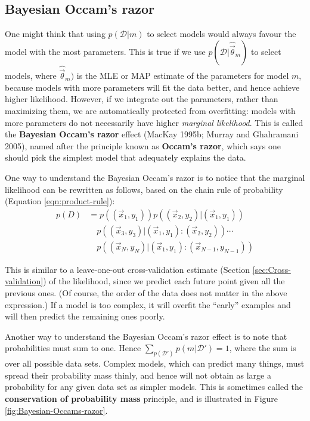 \subsection{Bayesian Occam's razor}
One might think that using $p(\mathcal{D}|m)$ to select models would always favour the model with the most parameters. This is true if we use $p(\mathcal{D}|\hat{\vec{\theta}}_m)$ to select models, where $\hat{\vec{\theta}}_m)$ is the MLE or MAP estimate of the parameters for model $m$, because models with more parameters will fit the data better, and hence achieve higher likelihood. However, if we integrate out the parameters, rather than maximizing them, we are automatically protected from overfitting: models with more parameters do not necessarily have higher \emph{marginal likelihood}. This is called the \textbf{Bayesian Occam’s razor} effect (MacKay 1995b; Murray and Ghahramani 2005), named after the principle known as \textbf{Occam’s razor}, which says one should pick the simplest model that adequately explains the data.

One way to understand the Bayesian Occam’s razor is to notice that the marginal likelihood can be rewritten as follows, based on the chain rule of probability (Equation \ref{eqn:product-rule}):
\begin{equation}\begin{split}
p(D) & =p((\vec{x}_1,y_1))p((\vec{x}_2,y_2)|(\vec{x}_1,y_1)) \\
     & \quad p((\vec{x}_3,y_3)|(\vec{x}_1,y_1):(\vec{x}_2,y_2))\cdots \\
	 & \quad p((\vec{x}_N,y_N)|(\vec{x}_1,y_1):(\vec{x}_{N-1},y_{N-1}))
\end{split}\end{equation}

This is similar to a leave-one-out cross-validation estimate (Section \ref{sec:Cross-validation}) of the likelihood, since we predict each future point given all the previous ones. (Of course, the order of the data does not matter in the above expression.) If a model is too complex, it will overfit the “early” examples and will then predict the remaining ones poorly.

Another way to understand the Bayesian Occam’s razor effect is to note that probabilities must sum to one. Hence $\sum_{p(\mathcal{D}')} p(m|\mathcal{D}')=1$, where the sum is over all possible data sets. Complex models, which can predict many things, must spread their probability mass thinly, and hence will not obtain as large a probability for any given data set as simpler models. This is sometimes called the \textbf{conservation of probability mass} principle, and is illustrated in Figure \ref{fig:Bayesian-Occams-razor}.

